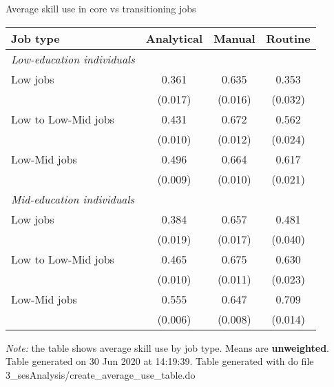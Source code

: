 \begin{center}
\begin{threeparttable}[!h]
\caption{Average skill use in core vs transitioning jobs}
\begin{tabular}{lccc}
\toprule
\toprule
\textbf{Job type}&\multicolumn{1}{c}{\textbf{Analytical}}&\multicolumn{1}{c}{\textbf{Manual}}&\multicolumn{1}{c}{\textbf{Routine}} \\
\midrule
\textit{Low-education individuals} \\  \midrule
\hspace{3mm}Low jobs&       0.361&       0.635&       0.353\\
                    &     (0.017)&     (0.016)&     (0.032)\\
\hspace{3mm}Low to Low-Mid jobs&       0.431&       0.672&       0.562\\
                    &     (0.010)&     (0.012)&     (0.024)\\
\hspace{3mm}Low-Mid jobs&       0.496&       0.664&       0.617\\
                    &     (0.009)&     (0.010)&     (0.021)\\
\textit{Mid-education individuals} \\  \midrule
\hspace{3mm}Low jobs&       0.384&       0.657&       0.481\\
                    &     (0.019)&     (0.017)&     (0.040)\\
\hspace{3mm}Low to Low-Mid  jobs&       0.465&       0.675&       0.630\\
                    &     (0.010)&     (0.011)&     (0.023)\\
\hspace{3mm}Low-Mid jobs&       0.555&       0.647&       0.709\\
                    &     (0.006)&     (0.008)&     (0.014)\\
\bottomrule
\bottomrule
\end{tabular}
\begin{tablenotes}
\item \footnotesize \textit{Note:} the table shows average skill use by job type. Means are \textbf{unweighted}. Table generated on 30 Jun 2020 at 14:19:39. Table generated with do file 3\_sesAnalysis/create\_average\_use\_table.do
\end{tablenotes}
\end{threeparttable}
\end{center}

